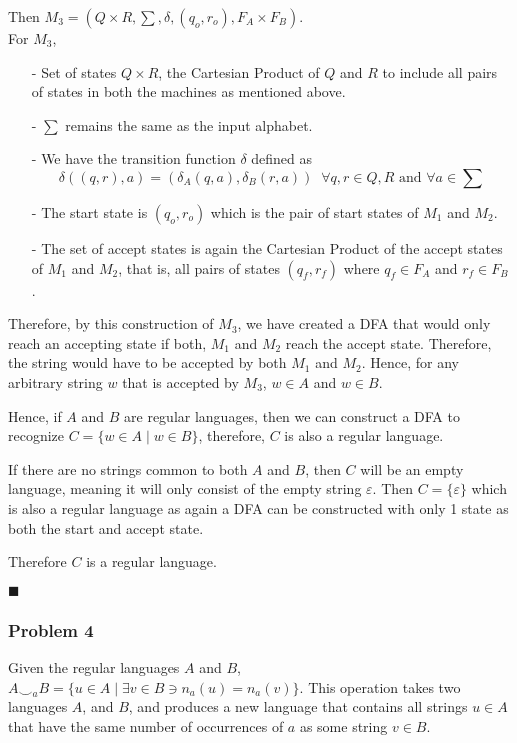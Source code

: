 \documentclass[addpoints]{exam}
\begin{document}
\begin{questions}
\begin{solution}
	Then $M_3 = (Q \times R, \sum, \delta, (q_o, r_o), F_A \times F_B)$. \\ For $M_3$, \vspace*{-3mm} 
	\begin{itemize}
		\item[-] Set of states $Q \times R $, the Cartesian Product of $Q$ and $R$ to include all pairs of states in both the machines as mentioned above. \vspace*{-2mm}
		\item[-] $\sum$ remains the same as the input alphabet. \vspace*{-2mm}
		\item[-] We have the transition function $\delta$ defined as \vspace*{-2mm}$$ \delta((q, r), a) = (\delta_A(q, a), \delta_B(r, a)) \;\; \forall q, r \in Q, R \text{ and } \forall a \in \sum $$ \vspace*{-8mm}
		\item[-] The start state is $ (q_o, r_o) $ which is the pair of start states of $M_1$ and $M_2$. \vspace*{-2mm}
		\item[-] The set of accept states is again the Cartesian Product of the accept states of $M_1$ and $M_2$, that is, all pairs of states $(q_f, r_f)$ where $q_f \in F_A$ and $r_f \in F_B$.
	\end{itemize}
	Therefore, by this construction of $M_3$, we have created a DFA that would only reach an accepting state if both, $M_1$ and $M_2$ reach the accept state. Therefore, the string would have to be accepted by both $M_1$ and $M_2$. Hence, for any arbitrary string $w$ that is accepted by $M_3$, $w \in A$ and $w \in B$. 

	Hence, if $A$ and $B$ are regular languages, then we can construct a DFA to recognize $ C = \{ w \in A \mid w \in B \} $, therefore, $C$ is also a regular language. 

	If there are no strings common to both $A$ and $B$, then $C$ will be an empty language, meaning it will only consist of the empty string $ \varepsilon $. Then $ C = \{ \varepsilon \} $ which is also a regular language as again a DFA can be constructed with only 1 state as both the start and accept state. 
	
	Therefore $C$ is a regular language.
	\begin{flushright}
		$\blacksquare$
	\end{flushright}

	\newpage
	\subsubsection*{Problem 4}
	Given the regular languages $A$ and $B$, $ A\smile_a B = \{ u\in A \mid \exists v\in B \ni n_a(u) = n_a(v) \} $. This operation takes two languages $A$, and $B$, and produces a new language that contains all strings $u \in A$ that have the same number of occurrences of $a$ as some string $v \in B$.
	

\end{solution}
\end{questions}
\end{document}
